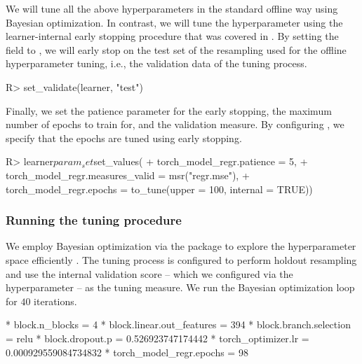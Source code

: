 \documentclass[article]{jss}
\theoremstyle{definition}
\begin{document}
We will tune all the above hyperparameters in the standard offline way using Bayesian optimization.
In contrast, we will tune the  hyperparameter using the learner-internal early stopping procedure that was covered in .
By setting the  field to , we will early stop on the test set of the resampling used for the offline hyperparameter tuning, i.e., the validation data of the tuning process.

\begin{CodeInput}
R> set_validate(learner, "test")
\end{CodeInput}

Finally, we set the patience parameter for the early stopping, the maximum number of epochs to train for, and the validation measure.
By configuring , we specify that the epochs are tuned using early stopping.

\begin{CodeInput}
R> learner$param_set$set_values(
+    torch_model_regr.patience = 5,
+    torch_model_regr.measures_valid = msr("regr.mse"),
+    torch_model_regr.epochs = to_tune(upper = 100, internal = TRUE))
\end{CodeInput}

\subsubsection{Running the tuning procedure}

We employ Bayesian optimization via the  package to explore the hyperparameter space efficiently \citep{ref-mlr3mbo}.
The tuning process is configured to perform holdout resampling and use the internal validation score -- which we configured via the  hyperparameter -- as the tuning measure.
We run the Bayesian optimization loop for $40$ iterations.

\begin{CodeOutput}
* block.n_blocks = 4
* block.linear.out_features = 394
* block.branch.selection = relu
* block.dropout.p = 0.526923747174442
* torch_optimizer.lr = 0.000929559084734832
* torch_model_regr.epochs = 98
\end{CodeOutput}
\end{document}
